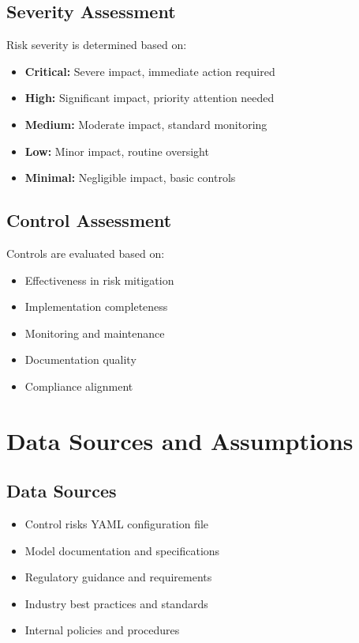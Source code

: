 \documentclass[11pt,a4paper]{article}
\begin{document}
\subsection{Severity Assessment}
Risk severity is determined based on:
\begin{itemize}
\item \textbf{Critical:} Severe impact, immediate action required
\item \textbf{High:} Significant impact, priority attention needed
\item \textbf{Medium:} Moderate impact, standard monitoring
\item \textbf{Low:} Minor impact, routine oversight
\item \textbf{Minimal:} Negligible impact, basic controls
\end{itemize}

\subsection{Control Assessment}
Controls are evaluated based on:
\begin{itemize}
\item Effectiveness in risk mitigation
\item Implementation completeness
\item Monitoring and maintenance
\item Documentation quality
\item Compliance alignment
\end{itemize}

\section{Data Sources and Assumptions}

\subsection{Data Sources}
\begin{itemize}
\item Control risks YAML configuration file
\item Model documentation and specifications
\item Regulatory guidance and requirements
\item Industry best practices and standards
\item Internal policies and procedures
\end{itemize}
\end{document}
